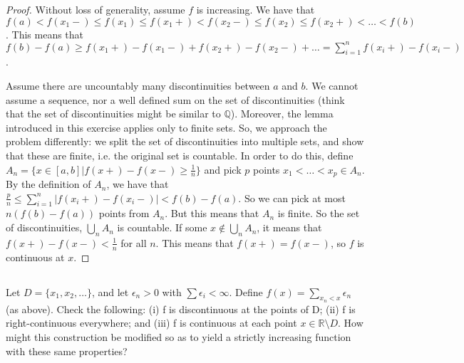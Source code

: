 \begin{proof}
Without loss of generality, assume $f$ is increasing. We have that $f(a) < f(x_1-) \leq f(x_1) \leq f(x_1+) < f(x_2-) \leq f(x_2) \leq f(x_2+) < \dots < f(b)$. This means that $f(b) - f(a) \geq f(x_1+) - f(x_1-) + f(x_2+) - f(x_2-) + \dots = \sum_{i=1}^n f(x_i+)-f(x_i-)$.

Assume there are uncountably many discontinuities between $a$ and $b$. We cannot assume a sequence, nor a well defined sum on the set of discontinuities (think that the set of discontinuities might be similar to $\mathbb{Q}$). Moreover, the lemma introduced in this exercise applies only to finite sets. So, we approach the problem differently: we split the set of discontinuities into multiple sets, and show that these are finite, i.e. the original set is countable. In order to do this, define $A_n = \{x\in[a,b] | f(x+) - f(x-) \geq \frac{1}{n}\}$ and pick $p$ points $x_1 < \dots < x_p \in A_n$. By the definition of $A_n$, we have that $\frac{p}{n} \leq \sum_{i=1}^n|f(x_i+) - f(x_i-)| < f(b) - f(a)$. So we can pick at most $n(f(b) - f(a))$ points from $A_n$. But this means that $A_n$ is finite. So the set of discontinuities, $\bigcup_n A_n$ is countable. If some $x \notin \bigcup_n A_n$, it means that $f(x+) - f(x-) < \frac{1}{n}$ for all $n$. This means that $f(x+) = f(x-)$, so $f$ is continuous at $x$.

\end{proof}

\subsection{} Let $D = \{x_1 ,x_2, \dots \}$, and let $\epsilon_n > 0$ with $\sum \epsilon_i < \infty$. Define $f(x) = \sum_{x_n<x} \epsilon_n$ (as above). Check the following: (i) f is discontinuous at the points of D; (ii) f is right-continuous everywhere;  and (iii) f is continuous at each point $x \in \mathbb{R} \setminus D$. How might this construction be modified so as to yield a strictly increasing function with these same properties? 

